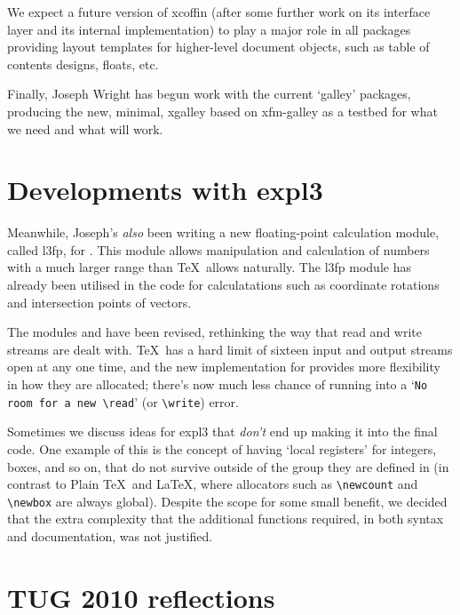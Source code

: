\documentclass{ltnews}
\begin{document}
We expect a future version of \textsf{xcoffin} (after some further work on its
interface layer and its internal implementation) to play a major role in all
packages providing layout templates for higher-level document objects, such as
table of contents designs, floats, etc.

Finally,
Joseph Wright has begun work with the current `galley' packages, producing the
new, minimal, \textsf{xgalley} based on \textsf{xfm-galley} as a testbed for
what we need and what will work.


\section{Developments with \textsf{expl3}}

Meanwhile, Joseph's \emph{also} been writing a new floating-point calculation
module, called \textsf{l3fp}, for . This module allows manipulation
and calculation of numbers with a much larger range than \TeX\ allows
naturally. The \textsf{l3fp} module has already been utilised in the
 code for calculatations such as coordinate rotations and
intersection points of vectors.

The modules  and  have been revised, rethinking the way
that read and write streams are dealt with. \TeX\ has a hard limit of sixteen
input and output streams open at any one time, and the new implementation for
 provides more flexibility in how they are allocated; there's now
much less chance of running into a `\verb|No room for a new \read|' (or
\verb|\write|) error.

Sometimes we discuss ideas for \textsf{expl3} that \emph{don't} end up making
it into the final code. One example of this is the concept of having `local
registers' for integers, boxes, and so on, that do not survive outside of the
group they are defined in (in contrast to Plain \TeX\ and \LaTeX, where
allocators such as \verb|\newcount| and \verb|\newbox| are always global).
Despite the scope for some small benefit, we decided that the extra complexity
that the additional functions required, in both syntax and documentation, was
not justified.


\section{TUG 2010 reflections}


\end{document}
